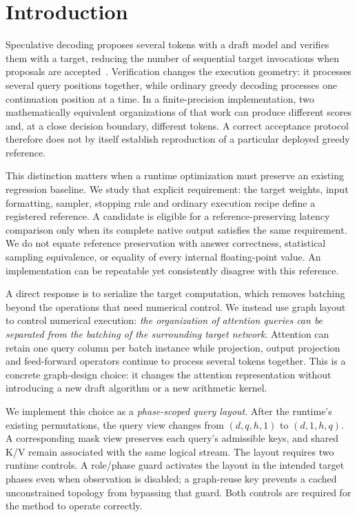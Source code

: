 \section{Introduction}
\label{sec:intro}
Speculative decoding proposes several tokens with a draft model and verifies them with a target, reducing the number of sequential target invocations when proposals are accepted~\cite{leviathan2023}. Verification changes the execution geometry: it processes several query positions together, while ordinary greedy decoding processes one continuation position at a time. In a finite-precision implementation, two mathematically equivalent organizations of that work can produce different scores and, at a close decision boundary, different tokens. A correct acceptance protocol therefore does not by itself establish reproduction of a particular deployed greedy reference.

This distinction matters when a runtime optimization must preserve an existing regression baseline. We study that explicit requirement: the target weights, input formatting, sampler, stopping rule and ordinary execution recipe define a registered reference. A candidate is eligible for a reference-preserving latency comparison only when its complete native output satisfies the same requirement. We do not equate reference preservation with answer correctness, statistical sampling equivalence, or equality of every internal floating-point value. An implementation can be repeatable yet consistently disagree with this reference.

A direct response is to serialize the target computation, which removes batching beyond the operations that need numerical control. We instead use graph layout to control numerical execution: \emph{the organization of attention queries can be separated from the batching of the surrounding target network}. Attention can retain one query column per batch instance while projection, output projection and feed-forward operators continue to process several tokens together. This is a concrete graph-design choice: it changes the attention representation without introducing a new draft algorithm or a new arithmetic kernel.

We implement this choice as a \emph{phase-scoped query layout}. After the runtime's existing permutations, the query view changes from $(d,q,h, 1)$ to $(d, 1,h,q)$. A corresponding mask view preserves each query's admissible keys, and shared K/V remain associated with the same logical stream. The layout requires two runtime controls. A role/phase guard activates the layout in the intended target phases even when observation is disabled; a graph-reuse key prevents a cached unconstrained topology from bypassing that guard. Both controls are required for the method to operate correctly.

